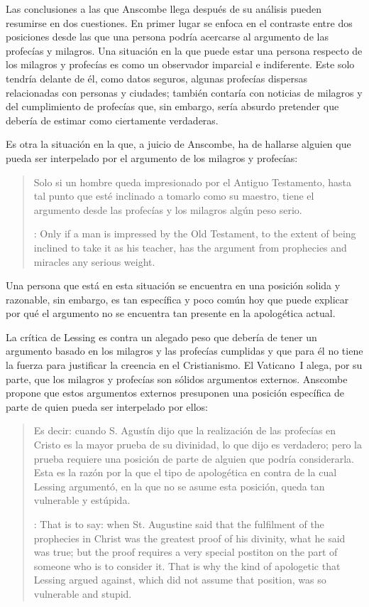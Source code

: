 Las conclusiones a las que Anscombe llega después de su análisis pueden
resumirse en dos cuestiones. En primer lugar se enfoca en el contraste entre dos
posiciones desde las que una persona podría acercarse al argumento de las
profecías y milagros. Una situación en la que puede estar una persona respecto
de los milagros y profecías es como un observador imparcial e indiferente. Este
solo tendría delante de él, como datos seguros, algunas profecías dispersas
relacionadas con personas y ciudades; también contaría con noticias de milagros
y del cumplimiento de profecías que, sin embargo, sería absurdo pretender que
debería de estimar como ciertamente verdaderas.

Es otra la situación en la que, a juicio de Anscombe, ha de hallarse alguien que
pueda ser interpelado por el argumento de los milagros y profecías:
\blockquote[{\cite[35]{anscombe2008faith:prophandmi}}: Only if a man is
impressed by the Old Testament, to the extent of being inclined to take it as
his teacher, has the argument from prophecies and miracles any serious
weight.]{Solo si un hombre queda impresionado por el Antiguo Testamento, hasta
  tal punto que esté inclinado a tomarlo como su maestro, tiene el argumento
  desde las profecías y los milagros algún peso serio.} Una persona que está en
esta situación se encuentra en una posición solida y razonable, sin embargo, es
tan específica y poco común hoy que puede explicar por qué el argumento no se
encuentra tan presente en la apologética actual.

La crítica de Lessing es contra un alegado peso que debería de tener un
argumento basado en los milagros y las profecías cumplidas y que para él no
tiene la fuerza para justificar la creencia en el Cristianismo. El Vaticano~I
alega, por su parte, que los milagros y profecías son sólidos argumentos
externos. Anscombe propone que estos argumentos externos presuponen una posición
específica de parte de quien pueda ser interpelado por ellos:
\blockquote[{\cite[37]{anscombe2008faith:prophandmi}}: That is to say: when St.
Augustine said that the fulfilment of the prophecies in Christ was the greatest
proof of his divinity, what he said was true; but the proof requires a very
special postiton on the part of someone who is to consider it. That is why the
kind of apologetic that Lessing argued against, which did not assume that
position, was so vulnerable and stupid.]{Es decir: cuando S. Agustín dijo que la
  realización de las profecías en Cristo es la mayor prueba de su divinidad, lo
  que dijo es verdadero; pero la prueba requiere una posición de parte de
  alguien que podría considerarla. Esta es la razón por la que el tipo de
  apologética en contra de la cual Lessing argumentó, en la que no se asume esta
  posición, queda tan vulnerable y estúpida.}

